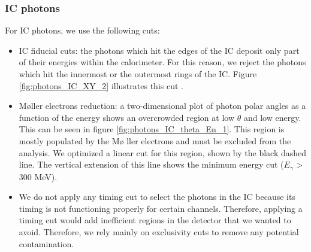\subsubsection*{IC photons}
For IC photons, we use the following cuts:
\begin{itemize}
\item IC fiducial cuts: the photons which hit the edges of the IC deposit only 
   part of their energies within the calorimeter. For this reason, we reject 
   the photons which hit the innermost or the outermost rings of the IC.  
   Figure \ref{fig:photons_IC_XY_2} illustrates this cut \cite{FX_thesis}.
\item M\o ller electrons reduction: a two-dimensional plot of photon polar 
   angles as a function of the energy shows an overcrowded region at low 
   $\theta$ and low energy. This can be seen in figure 
   \ref{fig:photons_IC_theta_En_1}. This region is mostly populated by the M\o 
   ller electrons and must be excluded from the analysis. We optimized a linear 
   cut for this region, shown by the black dashed line. The vertical extension 
   of this line shows the minimum energy cut ($E_{\gamma}$ > 300 MeV).
\item We do not apply any timing cut to select the photons in the IC because 
   its timing is not functioning properly for certain channels. Therefore, 
   applying a timing cut would add inefficient regions in the detector that we 
   wanted to avoid.  Therefore, we rely mainly on exclusivity cuts to remove 
   any potential contamination.

\end{itemize}

